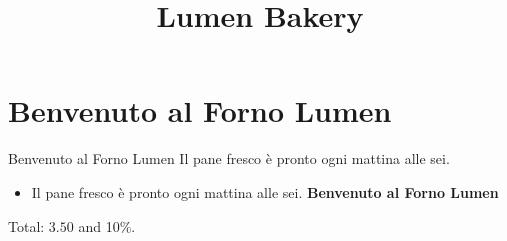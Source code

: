 \documentclass{article}
\title{Lumen Bakery}
\begin{document}
\maketitle
\section{Benvenuto al Forno Lumen}
Benvenuto al Forno Lumen
Il pane fresco è pronto ogni mattina alle sei.

\begin{itemize}
\item Il pane fresco è pronto ogni mattina alle sei. \textbf{Benvenuto al Forno Lumen}
\end{itemize}
Total: $3.50$ and 10\%.
\end{document}
